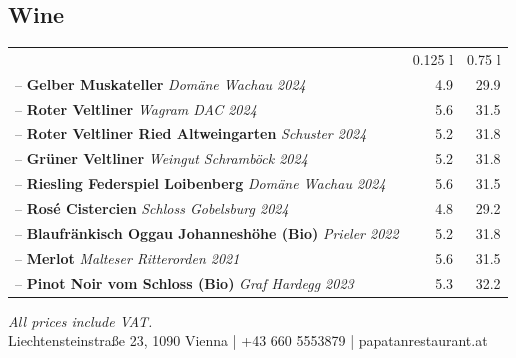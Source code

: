 \documentclass[a4paper,12pt]{article}
\begin{document}
\begin{multicols}{2}
\section*{Wine}
\begin{tabular}{Lrr}
& 0.125 l & 0.75 l\\
-- \textbf{Gelber Muskateller} \emph{Domäne Wachau 2024} & 4.9 & 29.9\\
-- \textbf{Roter Veltliner} \emph{Wagram DAC 2024} & 5.6 & 31.5\\
-- \textbf{Roter Veltliner Ried Altweingarten} \emph{Schuster 2024} & 5.2 & 31.8\\
-- \textbf{Grüner Veltliner} \emph{Weingut Schramböck 2024} & 5.2 & 31.8\\
-- \textbf{Riesling Federspiel Loibenberg} \emph{Domäne Wachau 2024} & 5.6 & 31.5\\
-- \textbf{Rosé Cistercien} \emph{Schloss Gobelsburg 2024} & 4.8 & 29.2\\
-- \textbf{Blaufränkisch Oggau Johanneshöhe (Bio)} \emph{Prieler 2022} & 5.2 & 31.8\\
-- \textbf{Merlot} \emph{Malteser Ritterorden 2021} & 5.6 & 31.5\\
-- \textbf{Pinot Noir vom Schloss (Bio)} \emph{Graf Hardegg 2023} & 5.3 & 32.2
\end{tabular}

\end{multicols}

\vfill
\begin{center}
    {\small \textit{All prices include VAT.}}\\
    {\small Liechtensteinstraße 23, 1090 Vienna \quad | \quad +43 660 5553879 \quad | \quad papatanrestaurant.at}
\end{center}
\end{document}
